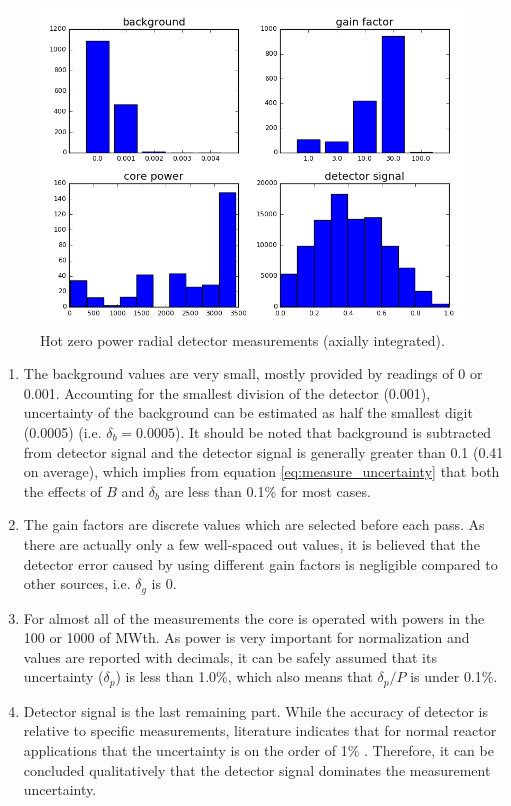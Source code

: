 \documentclass{article}
\begin{document}
\begin{figure}[ht]
\centering
\includegraphics[keepaspectratio, width = 4.0 in]{figures/flux_map_uncertainties/ranges_measured_data}
\caption{Hot zero power radial detector measurements (axially integrated).}
\label{fig:fig_ranges_measured_data}
\end{figure}

\begin{enumerate}
\item The background values are very small, mostly provided by readings of 0 or 0.001. Accounting for the smallest division of the detector (0.001), uncertainty of the background can be estimated as half the smallest digit (0.0005) (i.e. $\delta_b=0.0005$). It should be noted that background is subtracted from detector signal and the detector signal is generally greater than 0.1 (0.41 on average), which implies from equation \ref{eq:measure_uncertainty} that both the effects of $B$ and $\delta_b$ are less than 0.1\% for most cases. 
\item The gain factors are discrete values which are selected before each pass. As there are actually only a few well-spaced out values, it is believed that the detector error caused by using different gain factors is negligible compared to other sources, i.e. $\delta_g$ is 0.
\item For almost all of the measurements the core is operated with powers in the 100 or 1000 of MWth.  As power is very important for normalization and values are reported with decimals, it can be safely assumed that its uncertainty ($\delta_p$) is less than 1.0\%, which also means that $\delta_p/P$ is under 0.1\%. 
\item Detector signal is the last remaining part. While the accuracy of detector is relative to specific measurements, literature indicates that for normal reactor applications that the uncertainty is on the order of 1\% \cite{mitelman2001core}. Therefore, it can be concluded qualitatively that the detector signal dominates the measurement uncertainty.
\end{enumerate}
\end{document}
